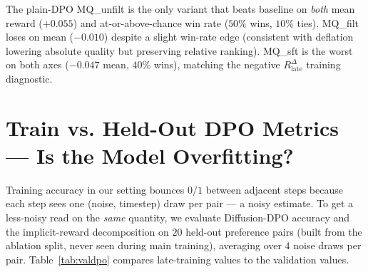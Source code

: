 \documentclass{article}
\begin{document}
\begin{table}[t]
\centering
\caption{Holdout MQ reward (20 prompts, 1 seed).  ``Mean'' is the average VideoReward MQ score; ``$\Delta$'' is the shift vs.\ the unaligned baseline; ``win\%'' is the fraction of holdout prompts where the LoRA beats the baseline.  Confidence interval at $N{=}20$, $p{=}0.5$ is $\pm 22$ pp on win rate.}
\label{tab:main}

\end{table}

The plain-DPO MQ\_unfilt is the only variant that beats baseline on \emph{both} mean reward ($+0.055$) and at-or-above-chance win rate ($50\%$ wins, $10\%$ ties).  MQ\_filt loses on mean ($-0.010$) despite a slight win-rate edge (consistent with deflation lowering absolute quality but preserving relative ranking).  MQ\_sft is the worst on both axes ($-0.047$ mean, $40\%$ wins), matching the negative $R^{\Delta}_{\text{late}}$ training diagnostic.

\section{Train vs. Held-Out DPO Metrics --- Is the Model Overfitting?}
\label{sec:overfit}

Training accuracy in our setting bounces $0/1$ between adjacent steps because each step sees one (noise, timestep) draw per pair --- a noisy estimate.  To get a less-noisy read on the \emph{same} quantity, we evaluate Diffusion-DPO accuracy and the implicit-reward decomposition on $20$ held-out preference pairs (built from the ablation split, never seen during main training), averaging over $4$ noise draws per pair.  Table~\ref{tab:valdpo} compares late-training values to the validation values.

\begin{table}[h]
\centering
\caption{Train vs. validation Diffusion-DPO metrics for the three MQ variants.  $R^{\Delta} = R_{\text{chosen}} - R_{\text{rejected}}$.  Validation is $20$ held-out pairs $\times$ $4$ noise draws each.  ``Spearman $\rho$ (val)'' is the per-pair correlation between the model's implicit margin and the underlying VideoReward score gap on the held-out pairs.}
\label{tab:valdpo}

\end{table}
\end{document}
